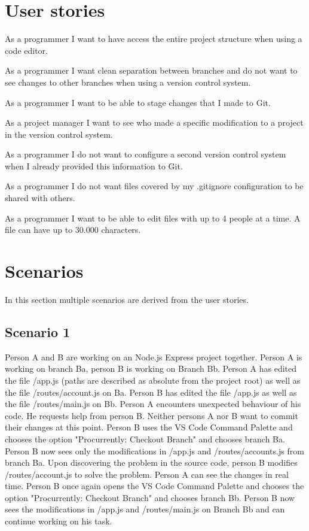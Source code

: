 \section{User stories}

As a programmer I want to have access the entire project structure when using a code editor.

As a programmer I want clean separation between branches and do not want to see changes to other branches when using a version control system.

As a programmer I want to be able to stage changes that I made to Git.

As a project manager I want to see who made a specific modification to a project in the version control system.

As a programmer I do not want to configure a second version control system when I already provided this information to Git.

As a programmer I do not want files covered by my .gitignore configuration to be shared with others.

As a programmer I want to be able to edit files with up to 4 people at a time. A file can have up to 30.000 characters.

\section{Scenarios}
\label{sec:scenarios}
In this section multiple scenarios are derived from the user stories.

\subsection{Scenario 1}
\label{sec:scenario1}
Person A and B are working on an Node.js Express project together. Person A is working on branch Ba, person B is working on Branch Bb.
Person A has edited the file /app.js (paths are described as absolute from the project root) as well as the file /routes/account.js on Ba.
Person B has edited the file /app.js as well as the file /routes/main.js on Bb.
Person A encounters unexpected behaviour of his code. He requests help from person B.
Neither persons A nor B want to commit their changes at this point.
Person B uses the VS Code Command Palette and chooses the option "Procurrently: Checkout Branch" and chooses branch Ba.
Person B now sees only the modifications in /app.js and /routes/accounts.js from branch Ba.
Upon discovering the problem in the source code, person B modifies /routes/account.js to solve the problem.
Person A can see the changes in real time.
Person B once again opens the VS Code Command Palette and chooses the option "Procurrently: Checkout Branch" and chooses branch Bb.
Person B now sees the modifications in /app.js and /routes/main.js on Branch Bb and can continue working on his task.

